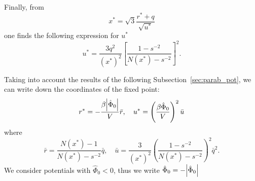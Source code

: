 Finally, from 
\begin{equation*}
	x^* = \sqrt{3} \frac{r^* + q}{\sqrt{u^*}}
\end{equation*}
one finds the following expression for $u^*$
\begin{equation*}
	u^* = \frac{3 q^2}{(x^*)^2} \left[\frac{1 - s^{-2}}{N(x^*) - s^{-2}}\right]^2.
\end{equation*}

Taking into account the results of the following Subsection~\ref{sec:parab_pot}, we can write down the coordinates of the fixed point:
\begin{equation}
	r^* = - {\frac{\beta \abs{\hat{\Phi}_0}}{V}} \bar{r}, 
	\quad 
	u^* = \left(\frac{\beta \hat{\Phi}_0}{V}\right)^2 \bar{u}
\end{equation}
where
\begin{equation*}
	\bar{r} = \frac{N(x^*) - 1}{N(x^*) - s^{-2}} \bar{q}, 
	\quad 
	\bar{u} = \frac{3}{(x^*)^2} \left(\frac{1 - s^{-2}}{N(x^*) - s^{-2}}\right)^2 \bar{q}^2.
\end{equation*}
We consider potentials with $\hat{\Phi}_0 < 0$, thus we write $\hat{\Phi}_0 = -\abs{\hat{\Phi}_0}$

